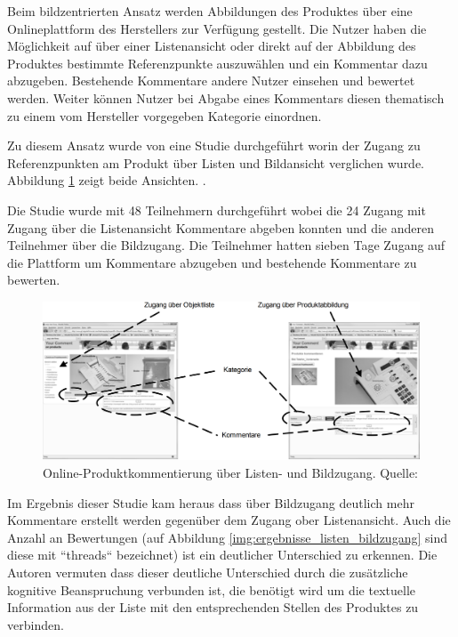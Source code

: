 Beim bildzentrierten Ansatz werden Abbildungen des Produktes über eine Onlineplattform des Herstellers zur Verfügung gestellt. Die Nutzer haben die Möglichkeit auf über einer Listenansicht oder direkt auf der 
Abbildung des Produktes bestimmte Referenzpunkte auszuwählen und ein Kommentar dazu abzugeben. Bestehende Kommentare andere Nutzer einsehen und bewertet werden. Weiter können Nutzer bei Abgabe eines Kommentars
diesen thematisch zu einem vom Hersteller vorgegeben Kategorie einordnen. \cite[S.~127]{Kirschner2012}

Zu diesem Ansatz wurde \citeyear{Kirschner2011} von \citeauthor{Kirschner2011} eine Studie durchgeführt worin der Zugang zu Referenzpunkten am Produkt über Listen und Bildansicht verglichen wurde. Abbildung 
\ref{img:ipi_list_image} zeigt beide Ansichten. \cite{Kirschner2011}.

Die Studie wurde mit 48 Teilnehmern durchgeführt wobei die 24 Zugang mit Zugang über die Listenansicht Kommentare abgeben konnten und die anderen Teilnehmer über die Bildzugang. Die Teilnehmer hatten sieben Tage 
Zugang auf die Plattform um Kommentare abzugeben und bestehende Kommentare zu bewerten. 

\begin{figure}[H]
	\centering
	\includegraphics[width=1.0\textwidth]{resources/analyse/IPI_Vergleich_Listen_BildAnnotationeAnsicht.png}
	\caption{Online-Produktkommentierung über Listen- und Bildzugang. Quelle: \cite[S.~7]{Kirschner2011}}
	\label{img:ipi_list_image}
\end{figure}

Im Ergebnis dieser Studie kam heraus dass über Bildzugang deutlich mehr Kommentare erstellt werden gegenüber dem Zugang ober Listenansicht. Auch die Anzahl an Bewertungen (auf Abbildung \ref{img:ergebnisse_listen_bildzugang} sind diese mit ``threads`` bezeichnet) ist ein deutlicher Unterschied zu erkennen. Die Autoren vermuten dass dieser deutliche Unterschied durch die 
zusätzliche kognitive Beanspruchung verbunden ist, die benötigt wird um die textuelle Information aus der Liste mit den entsprechenden Stellen des Produktes zu verbinden.

